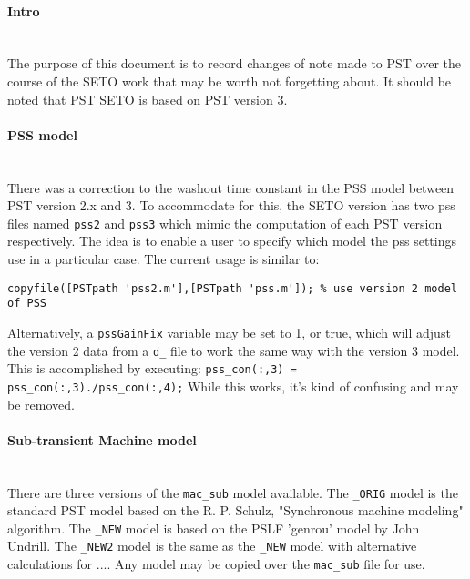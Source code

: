 \documentclass[12pt]{article}
\begin{document}
\onehalfspacing
\paragraph{Intro} \ \\
The purpose of this document is to record changes of note made to PST over the course of the SETO work that may be worth not forgetting about.
It should be noted that PST SETO is based on PST version 3.

\paragraph{PSS model} \ \\
There was a correction to the washout time constant in the PSS model between PST version 2.x and 3.
To accommodate for this, the SETO version has two pss files named \verb|pss2| and \verb|pss3| which mimic the computation of each PST version respectively.
The idea is to enable a user to specify which model the pss settings use in a particular case.
The current usage is similar to:
\begin{verbatim}
copyfile([PSTpath 'pss2.m'],[PSTpath 'pss.m']); % use version 2 model of PSS
\end{verbatim}

Alternatively, a \verb|pssGainFix| variable may be set to 1, or true, which will adjust the version 2 data from a \verb|d_| file to work the same way with the version 3 model.
This is accomplished by executing: \verb|pss_con(:,3) = pss_con(:,3)./pss_con(:,4);|
While this works, it's kind of confusing and may be removed.

\paragraph{Sub-transient Machine model} \ \\
There are three versions of the \verb|mac_sub| model available.
The \verb|_ORIG| model is the standard PST model based on the R. P. Schulz, "Synchronous machine modeling" algorithm.
The \verb|_NEW| model is based on the PSLF 'genrou' model by John Undrill.
The \verb|_NEW2| model is the same as the \verb|_NEW| model with alternative calculations for ....
Any model may be copied over the \verb|mac_sub| file for use.
\end{document}

